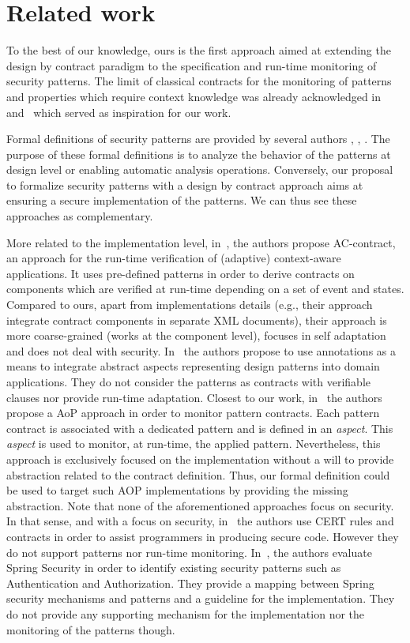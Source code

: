 \section{Related work}
\label{sec:related-work}

To the best of our knowledge, ours is the first approach aimed at extending the design by contract paradigm to the specification and run-time monitoring of security patterns. The limit of classical contracts for the monitoring of patterns and properties which require context knowledge was already acknowledged in~\cite{hallstrom2004} and~\cite{ostroff2009beyond} which served as inspiration for our work. 

Formal definitions of security patterns are provided by several authors \cite{cheng2019}, \cite{behrens2018}, \cite{daSilva2013}. The purpose of these formal definitions is to analyze the behavior of the patterns at design level or enabling automatic analysis operations. Conversely, our proposal to formalize security patterns with a design by contract approach aims at ensuring a secure implementation of the patterns. We can thus see these approaches as complementary. 

More related to the implementation level, in~\cite{mongiello2015ac}, the authors propose AC-contract, an approach for the run-time verification of (adaptive) context-aware applications. It uses pre-defined patterns in order to derive contracts on components which are verified at run-time depending on a set of event and states. Compared to ours, apart from implementations details (e.g., their approach integrate contract components in separate XML documents), their approach is more coarse-grained (works at the component level), focuses in self adaptation and does not deal with security. In~\cite{giunta2010using} the authors propose to use annotations as a means to integrate abstract aspects representing design patterns into domain applications. They do not consider the patterns as contracts with verifiable clauses nor provide run-time adaptation. Closest to our work, in~\cite{hallstrom2004} the authors propose a AoP approach in order to monitor pattern contracts. Each pattern contract is associated with a dedicated pattern and is defined in an \emph{aspect}. This \emph{aspect} is used to monitor, at run-time, the applied pattern. Nevertheless, this approach is exclusively focused on the implementation without a will to provide abstraction related to the contract definition. Thus, our formal definition could be used to target such AOP implementations by providing the missing abstraction. Note that none of the aforementioned approaches focus on security. In that sense, and with a focus on security,  in~\cite{li2017enhancing} the authors use CERT rules and contracts in order to assist programmers in producing secure code. However they do not support patterns nor run-time monitoring.  In~\cite{dikanski2012identification}, the authors evaluate Spring Security in order to identify existing security patterns such as Authentication and Authorization. They provide a mapping between Spring security mechanisms and patterns and a guideline for the implementation. They do not provide any supporting mechanism for the implementation nor the monitoring of the patterns though.


